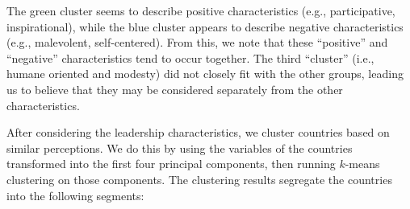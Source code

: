 \documentclass[
]{article}
\begin{document}
The green cluster seems to describe positive characteristics (e.g.,
participative, inspirational), while the blue cluster appears to
describe negative characteristics (e.g., malevolent, self-centered).
From this, we note that these ``positive'' and ``negative''
characteristics tend to occur together. The third ``cluster'' (i.e.,
humane oriented and modesty) did not closely fit with the other groups,
leading us to believe that they may be considered separately from the
other characteristics.

After considering the leadership characteristics, we cluster countries
based on similar perceptions. We do this by using the variables of the
countries transformed into the first four principal components, then
running \(k\)-means clustering on those components. The clustering
results segregate the countries into the following segments:
\end{document}
